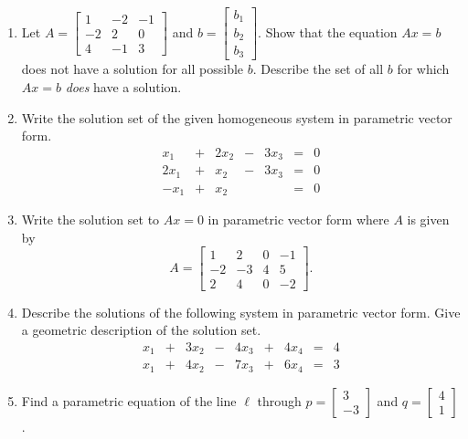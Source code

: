\documentclass[12pt]{article}
\begin{document}
\begin{multicols*}{2}
\begin{enumerate}
		\item Let $A = \begin{bmatrix}
			1 & -2 & -1\\
			-2 & 2 & 0\\
			4 & -1 & 3
		\end{bmatrix}$ and $b = \begin{bmatrix}
			b_1\\b_2\\b_3
		\end{bmatrix}$.
		Show that the equation $Ax=b$ does not have a solution for all possible $b$. Describe the set of all $b$ for which $Ax=b$ \textit{does} have a solution.
		\vfill

		\item Write the solution set of the given homogeneous system in parametric vector form.
		\[
		\begin{array}{rcrcrcr}
			x_1 & + & 2x_2 & - & 3x_3 &=&0\\
			2x_1 & + & x_2 & - & 3x_3 & = & 0\\
			-x_1 & + & x_2 & && = & 0
		\end{array}
		\]
		\vfill

		\item Write the solution set to $Ax=0$ in parametric vector form where $A$ is given by
		\[
		A = \begin{bmatrix}
			1 & 2 & 0 & -1\\
			-2 & -3 & 4 & 5\\
			2 & 4 & 0 & -2
		\end{bmatrix}.
		\]
		\vfill

		\item Describe the solutions of the following system in parametric vector form. Give a geometric description of the solution set.
		\[
		\begin{array}{rcrcrcrcr}
			x_1 & + & 3x_2 & - & 4x_3 & + & 4x_4 & = & 4\\
			x_1 & + & 4x_2 & - & 7x_3 & +&6x_4 & = & 3
		\end{array}
		\]
		\vfill\null\pagebreak

		\item Find a parametric equation of the line $\ell$ through $p=\begin{bmatrix}
			3\\-3
		\end{bmatrix}$ and $q=\begin{bmatrix}
			4\\1
		\end{bmatrix}$.
		\vfill


\end{enumerate}
\end{multicols*}
\end{document}
